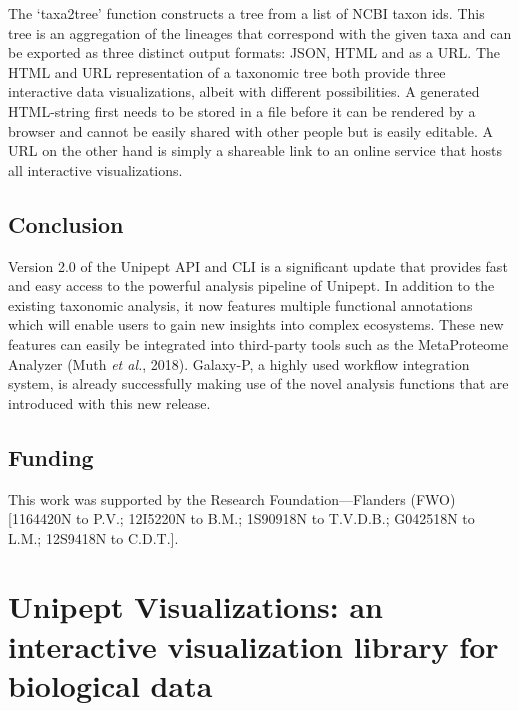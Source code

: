 The `taxa2tree' function constructs a tree from a list of NCBI taxon
ids. This tree is an aggregation of the lineages that correspond with
the given taxa and can be exported as three distinct output formats:
JSON, HTML and as a URL. The HTML and URL representation of a taxonomic
tree both provide three interactive data visualizations, albeit with
different possibilities. A generated HTML-string first needs to be
stored in a file before it can be rendered by a browser and cannot be
easily shared with other people but is easily editable. A URL on the
other hand is simply a shareable link to an online service that hosts
all interactive visualizations.

\hypertarget{conclusion-1}{%
\section{Conclusion}\label{conclusion-1}}

Version 2.0 of the Unipept API and CLI is a significant update that
provides fast and easy access to the powerful analysis pipeline of
Unipept. In addition to the existing taxonomic analysis, it now features
multiple functional annotations which will enable users to gain new
insights into complex ecosystems. These new features can easily be
integrated into third-party tools such as the MetaProteome Analyzer
(Muth \emph{et al.}, 2018). Galaxy-P, a highly used workflow integration
system, is already successfully making use of the novel analysis
functions that are introduced with this new release.

\hypertarget{funding}{%
\section{Funding}\label{funding}}

This work was supported by the Research Foundation---Flanders (FWO)
{[}1164420N to P.V.; 12I5220N to B.M.; 1S90918N to T.V.D.B.; G042518N to
L.M.; 12S9418N to C.D.T.{]}.

\hypertarget{unipept-visualizations-an-interactive-visualization-library-for-biological-data}{%
\chapter{Unipept Visualizations: an interactive visualization library
for biological
data}\label{unipept-visualizations-an-interactive-visualization-library-for-biological-data}}


